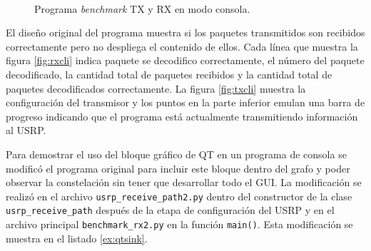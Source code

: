 \begin{figure}[htp]
  \centering
  \\
  \vspace{0.5in}
  \caption{Programa \emph{benchmark} TX y RX en modo consola.}
  \label{fig:benchcli}
\end{figure}

El dise\~no original del programa muestra si los paquetes transmitidos son recibidos
correctamente pero no despliega el contenido de ellos. Cada l\'inea que muestra la figura
\ref{fig:rxcli} indica paquete se decodifico correctamente, el n\'umero del paquete decodificado, la
cantidad total de paquetes recibidos y la cantidad total de paquetes decodificados correctamente. La
figura \ref{fig:txcli} muestra la configuraci\'on del transmisor y los puntos en la parte
inferior emulan una barra de progreso indicando que el programa est\'a actualmente transmitiendo
informaci\'on al USRP.

Para demostrar el uso del bloque gr\'afico de QT en un programa de consola se modific\'o el programa
original para incluir este bloque dentro del grafo y poder observar la constelaci\'on sin tener que
desarrollar todo el GUI. La modificaci\'on se realiz\'o en el archivo \verb|usrp_receive_path2.py|
dentro del constructor de la clase \verb|usrp_receive_path| despu\'es de la etapa de configuraci\'on
del USRP y en el archivo principal \verb|benchmark_rx2.py| en la funci\'on \verb|main()|. Esta
modificaci\'on se muestra en el listado \ref{ex:qtsink}.

